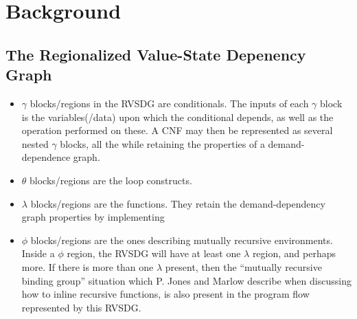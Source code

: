 
\section{Background}

\subsection{The Regionalized Value-State Depenency Graph}
\label{background:RVSDG}

\begin{itemize}

	\item \textit{$\gamma$} blocks/regions in the RVSDG are conditionals. The
inputs of each $\gamma$ block is the variables(/data) upon which the conditional
depends, as well as the operation performed on these. A CNF may then be
represented as several nested $\gamma$ blocks, all the while retaining the
properties of a demand-dependence graph.

	\item \textit{$\theta$} blocks/regions are the loop constructs.

	\item \textit{$\lambda$} blocks/regions are the functions. They retain the
demand-dependency graph properties by implementing

	\item \textit{$\phi$} blocks/regions are the ones describing mutually
recursive environments. Inside a $\phi$ region, the RVSDG will have at least one
$\lambda$ region, and perhaps more. If there is more than one $\lambda$ present,
then the ``mutually recursive binding group'' situation which P. Jones and
Marlow \cite{GHC-paper} describe when discussing how to inline recursive
functions, is also present in the program flow represented by this RVSDG.

\end{itemize}
